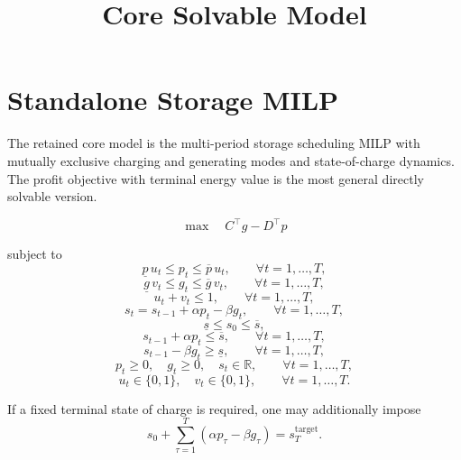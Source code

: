 \documentclass[11pt,a4paper]{article}
\title{Core Solvable Model}
\author{}
\date{}
\begin{document}
\maketitle

\section*{Standalone Storage MILP}
The retained core model is the multi-period storage scheduling MILP with mutually exclusive
charging and generating modes and state-of-charge dynamics. The profit objective with terminal
energy value is the most general directly solvable version.

\begin{equation}
\max \quad C^\top g - D^\top p
\tag{M1}
\end{equation}

subject to
\begin{equation}
\underline{p}\, u_t \le p_t \le \overline{p}\, u_t,
\qquad \forall t=1,\dots,T,
\tag{M2}
\end{equation}
\begin{equation}
\underline{g}\, v_t \le g_t \le \overline{g}\, v_t,
\qquad \forall t=1,\dots,T,
\tag{M3}
\end{equation}
\begin{equation}
u_t + v_t \le 1,
\qquad \forall t=1,\dots,T,
\tag{M4}
\end{equation}
\begin{equation}
s_t = s_{t-1} + \alpha p_t - \beta g_t,
\qquad \forall t=1,\dots,T,
\tag{M5}
\end{equation}
\begin{equation}
\underline{s} \le s_0 \le \overline{s},
\tag{M6}
\end{equation}
\begin{equation}
s_{t-1} + \alpha p_t \le \overline{s},
\qquad \forall t=1,\dots,T,
\tag{M7}
\end{equation}
\begin{equation}
s_{t-1} - \beta g_t \ge \underline{s},
\qquad \forall t=1,\dots,T,
\tag{M8}
\end{equation}
\begin{equation}
p_t \ge 0,\quad g_t \ge 0,\quad s_t \in \mathbb{R},
\qquad \forall t=1,\dots,T,
\tag{M9}
\end{equation}
\begin{equation}
u_t \in \{0,1\},\quad v_t \in \{0,1\},
\qquad \forall t=1,\dots,T.
\tag{M10}
\end{equation}

\noindent
If a fixed terminal state of charge is required, one may additionally impose
\begin{equation}
s_0 + \sum_{\tau=1}^T (\alpha p_\tau - \beta g_\tau) = s_T^{\mathrm{target}}.
\tag{M11}
\end{equation}
\end{document}
